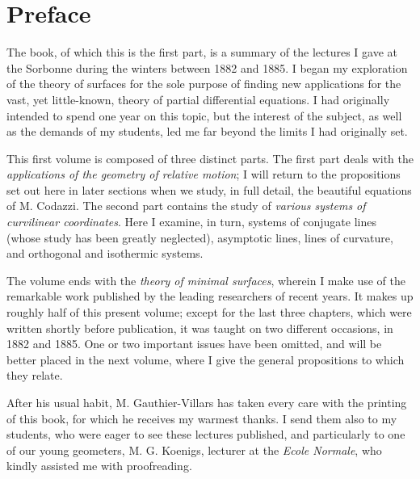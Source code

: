 \chapter*{Preface}

The book, of which this is the first part, is a summary of the lectures I gave at the Sorbonne
during the winters between 1882 and 1885. I began my exploration of the theory of surfaces for
the sole purpose of finding new applications for the vast, yet little-known, theory of partial
differential equations. I had originally intended to spend one year on this topic, but the
interest of the subject, as well as the demands of my students, led me far beyond the limits I
had originally set.

This first volume is composed of three distinct parts. The first part deals with the
\textit{applications of the geometry of relative motion}; I will return to the propositions set
out here in later sections when we study, in full detail, the beautiful equations of M. Codazzi.
The second part contains the study of \textit{various systems of curvilinear coordinates}. Here
I examine, in turn, systems of conjugate lines (whose study has been greatly neglected),
asymptotic lines, lines of curvature, and orthogonal and isothermic systems.

The volume ends with the \textit{theory of minimal surfaces}, wherein I make use of the
remarkable work published by the leading researchers of recent years. It makes up roughly half
of this present volume; except for the last three chapters, which were written shortly before
publication, it was taught on two different occasions, in 1882 and 1885. One or two important
issues have been omitted, and will be better placed in the next volume, where I give the general
propositions to which they relate.

After his usual habit, M. Gauthier-Villars has taken every care with the printing of this book,
for which he receives my warmest thanks. I send them also to my students, who were eager to see
these lectures published, and particularly to one of our young geometers, M. G. Koenigs, lecturer
at the \textit{Ecole Normale}, who kindly assisted me with proofreading.
